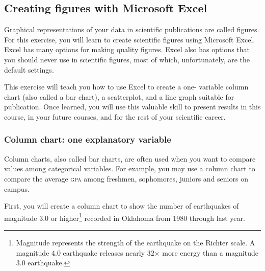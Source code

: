 \documentclass[12pt, hidelinks]{exam}
\begin{document}
\subsection*{Creating figures with Microsoft Excel\texttrademark}

Graphical representations of your data in scientific publications are called figures. For this exercise, you will learn to create scientific figures using Microsoft Excel. Excel has many options for making quality figures. Excel also has options that you should never use in scientific figures, most of which, unfortunately, are the default settings.  

This exercise will teach you how to use Excel to create a one-%
variable column chart (also called a bar chart), a scatterplot, and a line graph suitable for publication. Once learned, you will use this valuable skill to present results in this course, in your future courses, and for the rest of your scientific career. 

\subsubsection*{Column chart: one explanatory variable}

Column charts, also called bar charts, are often used when you want to compare values among categorical variables. For example, you may use a column chart to compare the average \textsc{gpa} among freshmen, sophomores, juniors and seniors on campus. 

First, you will create a column chart to show the number of earthquakes of magnitude 3.0 or higher\footnote{Magnitude represents the strength of the earthquake on the Richter scale. A magnitude 4.0 earthquake releases nearly 32$\times$ more energy than a magnitude 3.0 earthquake.} recorded in Oklahoma from 1980 through last year. \bigskip
\end{document}
